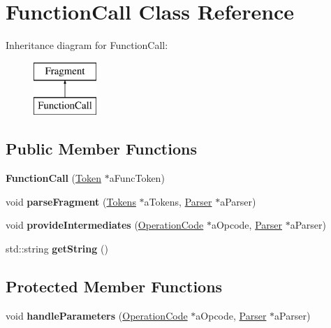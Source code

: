 \hypertarget{a00009}{\section{Function\+Call Class Reference}
\label{a00009}
}
Inheritance diagram for Function\+Call\+:\begin{figure}[H]
\begin{center}
\leavevmode
\includegraphics[height=2.000000cm]{da/da0/a00009}
\end{center}
\end{figure}
\subsection*{Public Member Functions}
\begin{DoxyCompactItemize}
\item 
\hypertarget{a00009_a6fc104abe67e06bc350b382078154016}{{\bfseries Function\+Call} (\hyperlink{a00025}{Token} $\ast$a\+Func\+Token)}\label{a00009_a6fc104abe67e06bc350b382078154016}

\item 
\hypertarget{a00009_ae9e672734e8d1256da3c47982d43aa82}{void {\bfseries parse\+Fragment} (\hyperlink{a00026}{Tokens} $\ast$a\+Tokens, \hyperlink{a00017}{Parser} $\ast$a\+Parser)}\label{a00009_ae9e672734e8d1256da3c47982d43aa82}

\item 
\hypertarget{a00009_aeb0aeff829ba6808d93ea8bc51c8de66}{void {\bfseries provide\+Intermediates} (\hyperlink{a00015}{Operation\+Code} $\ast$a\+Opcode, \hyperlink{a00017}{Parser} $\ast$a\+Parser)}\label{a00009_aeb0aeff829ba6808d93ea8bc51c8de66}

\item 
\hypertarget{a00009_a0e9cb53ae74b3a0c096f590d8a46ec6d}{std\+::string {\bfseries get\+String} ()}\label{a00009_a0e9cb53ae74b3a0c096f590d8a46ec6d}

\end{DoxyCompactItemize}
\subsection*{Protected Member Functions}
\begin{DoxyCompactItemize}
\item 
\hypertarget{a00009_ad46b2bedbc4e32b902639f02e8b980d4}{void {\bfseries handle\+Parameters} (\hyperlink{a00015}{Operation\+Code} $\ast$a\+Opcode, \hyperlink{a00017}{Parser} $\ast$a\+Parser)}\label{a00009_ad46b2bedbc4e32b902639f02e8b980d4}

\end{DoxyCompactItemize}
